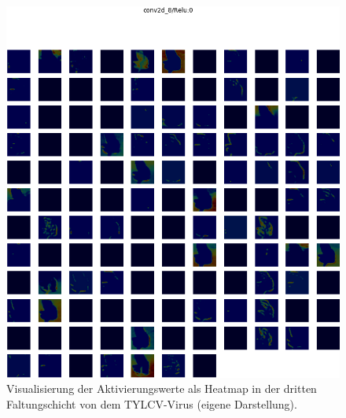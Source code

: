 \begin{figure}[h!]
	\centering
	\includegraphics[width=\textwidth]{visualisierungen/yellow/heapmap_mit/conv2d_8.png}
	\caption{Visualisierung der Aktivierungswerte als Heatmap in der dritten Faltungschicht von dem TYLCV-Virus (eigene Darstellung).}
	\label{}
\end{figure}

